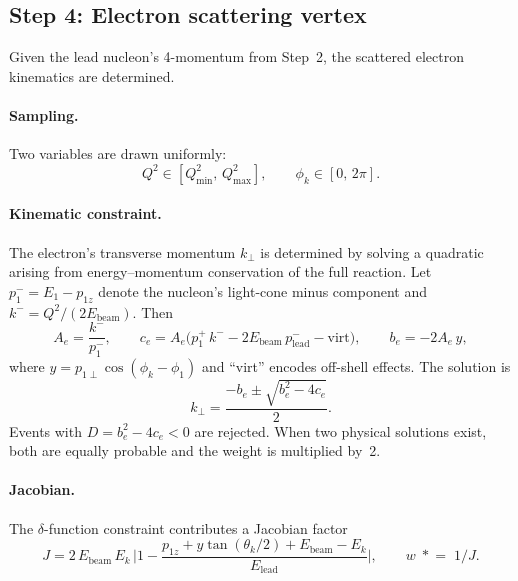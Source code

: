 \documentclass[11pt,a4paper]{article}
\begin{document}
\subsection{Step 4: Electron scattering vertex}

Given the lead nucleon's 4-momentum from Step~2, the scattered electron
kinematics are determined.

\paragraph{Sampling.}
Two variables are drawn uniformly:
\begin{equation}
  Q^{2} \in [Q^{2}_{\min},\,Q^{2}_{\max}],
  \qquad
  \phi_{k} \in [0,\,2\pi].
\end{equation}

\paragraph{Kinematic constraint.}
The electron's transverse momentum $k_{\perp}$ is determined by solving a
quadratic arising from energy--momentum conservation of the full reaction.
Let $p_{1}^{-} = E_{1} - p_{1z}$ denote the nucleon's light-cone minus
component and $k^{-} = Q^{2}/(2E_{\text{beam}})$.  Then
\begin{equation}
  A_{e} = \frac{k^{-}}{p_{1}^{-}}, \qquad
  c_{e} = A_{e}\bigl(p_{1}^{+}\,k^{-} - 2E_{\text{beam}}\,p_{\text{lead}}^{-}
          - \text{virt}\bigr),
  \qquad
  b_{e} = -2A_{e}\,y,
\end{equation}
where $y = p_{1\perp}\cos(\phi_{k} - \phi_{1})$
and ``virt'' encodes off-shell effects.  The solution is
\begin{equation}
  k_{\perp} = \frac{-b_{e} \pm \sqrt{b_{e}^{2} - 4c_{e}}}{2}.
\end{equation}
Events with $D = b_{e}^{2}-4c_{e} < 0$ are rejected.
When two physical solutions exist, both are equally probable and the
weight is multiplied by~2.

\paragraph{Jacobian.}
The $\delta$-function constraint contributes a Jacobian factor
\begin{equation}
  J = 2\,E_{\text{beam}}\,E_{k}\,
      \biggl|1 - \frac{p_{1z} + y\tan(\theta_{k}/2) + E_{\text{beam}} - E_{k}}
                      {E_{\text{lead}}}\biggr|,
  \qquad
  w \;\mathrel{*}=\; 1/J.
\end{equation}
\end{document}
